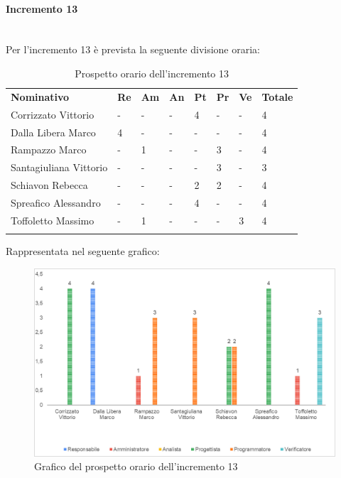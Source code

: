 \paragraph{Incremento 13} \mbox{} \\
Per l'incremento 13 è prevista la seguente divisione oraria:
\begin{longtable} {				
		>{}p{40mm}  
		>{}p{8mm}
		>{}p{8mm}
		>{}p{8mm}
		>{}p{8mm}
		>{}p{8mm}
		>{}p{8mm}
		>{}p{12mm}				
	}			
	\rowcolor{gray!50}
	\textbf{Nominativo} & \textbf{Re} & \textbf{Am} & \textbf{An} & \textbf{Pt} & \textbf{Pr} & \textbf{Ve} & \textbf{Totale}	\TBstrut \\ [2mm]
	Corrizzato Vittorio & - & - & - & 4 & - & - & 4 \TBstrut \\ [2mm]
	Dalla Libera Marco & 4 & - & - & - & - & - & 4 \TBstrut \\ [2mm]
	Rampazzo Marco & - & 1 & - & - & 3 & - & 4 \TBstrut \\ [2mm]
	Santagiuliana Vittorio & - & - & - & - & 3 & - & 3 \TBstrut \\ [2mm]
	Schiavon Rebecca & - & - & - & 2 & 2 & - & 4 \TBstrut \\ [2mm]
	Spreafico Alessandro & - & - & - & 4 & - & - & 4 \TBstrut \\ [2mm]
	Toffoletto Massimo & - & 1 & - & - & - & 3 & 4 \TBstrut \\ [2mm]
	\rowcolor{white}
	\caption{Prospetto orario dell'incremento 13}
\end{longtable}
Rappresentata nel seguente grafico:
\begin{figure} [H]
	\includegraphics[width=\linewidth]{./img/Grafici/20.png}
	\caption{Grafico del prospetto orario dell'incremento 13}
\end{figure}
